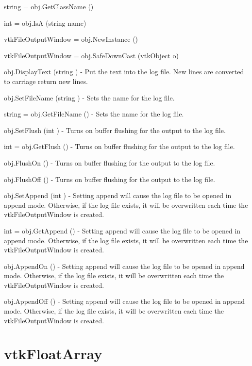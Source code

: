 \begin{DoxyItemize}
\item {\ttfamily string = obj.\-Get\-Class\-Name ()}  
\item {\ttfamily int = obj.\-Is\-A (string name)}  
\item {\ttfamily vtk\-File\-Output\-Window = obj.\-New\-Instance ()}  
\item {\ttfamily vtk\-File\-Output\-Window = obj.\-Safe\-Down\-Cast (vtk\-Object o)}  
\item {\ttfamily obj.\-Display\-Text (string )} -\/ Put the text into the log file. New lines are converted to carriage return new lines.  
\item {\ttfamily obj.\-Set\-File\-Name (string )} -\/ Sets the name for the log file.  
\item {\ttfamily string = obj.\-Get\-File\-Name ()} -\/ Sets the name for the log file.  
\item {\ttfamily obj.\-Set\-Flush (int )} -\/ Turns on buffer flushing for the output to the log file.  
\item {\ttfamily int = obj.\-Get\-Flush ()} -\/ Turns on buffer flushing for the output to the log file.  
\item {\ttfamily obj.\-Flush\-On ()} -\/ Turns on buffer flushing for the output to the log file.  
\item {\ttfamily obj.\-Flush\-Off ()} -\/ Turns on buffer flushing for the output to the log file.  
\item {\ttfamily obj.\-Set\-Append (int )} -\/ Setting append will cause the log file to be opened in append mode. Otherwise, if the log file exists, it will be overwritten each time the vtk\-File\-Output\-Window is created.  
\item {\ttfamily int = obj.\-Get\-Append ()} -\/ Setting append will cause the log file to be opened in append mode. Otherwise, if the log file exists, it will be overwritten each time the vtk\-File\-Output\-Window is created.  
\item {\ttfamily obj.\-Append\-On ()} -\/ Setting append will cause the log file to be opened in append mode. Otherwise, if the log file exists, it will be overwritten each time the vtk\-File\-Output\-Window is created.  
\item {\ttfamily obj.\-Append\-Off ()} -\/ Setting append will cause the log file to be opened in append mode. Otherwise, if the log file exists, it will be overwritten each time the vtk\-File\-Output\-Window is created.  
\end{DoxyItemize}\hypertarget{vtkcommon_vtkfloatarray}{}\section{vtk\-Float\-Array}\label{vtkcommon_vtkfloatarray}
